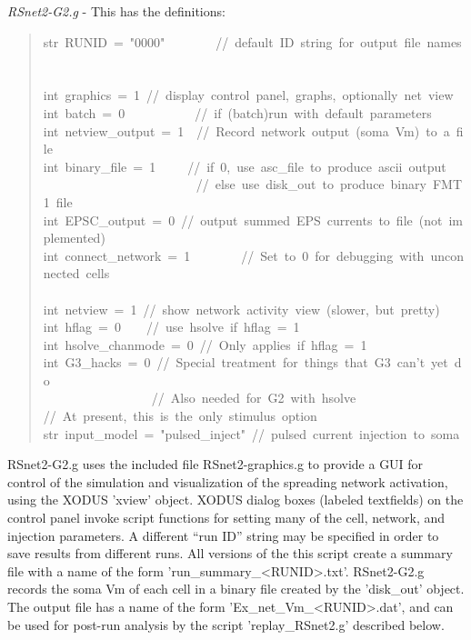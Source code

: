 \documentclass[10pt,a4paper,english]{article}
\begin{document}
\emph{RSnet2-G2.g} - This has the definitions:
\begin{quote}{\ttfamily \raggedright \noindent
str~RUNID~=~"0000"~~~~~~~~//~default~ID~string~for~output~file~names~\\
~\\
int~graphics~=~1~//~display~control~panel,~graphs,~optionally~net~view~\\
int~batch~=~0~~~~~~~~~~~//~if~(batch)run~with~default~parameters~\\
int~netview{\_}output~=~1~~//~Record~network~output~(soma~Vm)~to~a~file~\\
int~binary{\_}file~=~1~~~~~//~if~0,~use~asc{\_}file~to~produce~ascii~output~\\
~~~~~~~~~~~~~~~~~~~~~~~~//~else~use~disk{\_}out~to~produce~binary~FMT1~file~\\
int~EPSC{\_}output~=~0~//~output~summed~EPS~currents~to~file~(not~implemented)~\\
int~connect{\_}network~=~1~~~~~~~~//~Set~to~0~for~debugging~with~unconnected~cells~\\
~\\
int~netview~=~1~//~show~network~activity~view~(slower,~but~pretty)~\\
int~hflag~=~0~~~~//~use~hsolve~if~hflag~=~1~\\
int~hsolve{\_}chanmode~=~0~//~Only~applies~if~hflag~=~1~\\
int~G3{\_}hacks~=~0~//~Special~treatment~for~things~that~G3~can't~yet~do~\\
~~~~~~~~~~~~~~~~~//~Also~needed~for~G2~with~hsolve~\\
//~At~present,~this~is~the~only~stimulus~option~\\
str~input{\_}model~=~"pulsed{\_}inject"~//~pulsed~current~injection~to~soma
}\end{quote}

RSnet2-G2.g uses the included file RSnet2-graphics.g to provide a GUI for
control of the simulation and visualization of the spreading network
activation, using the XODUS 'xview' object.  XODUS dialog boxes (labeled
textfields) on the control panel invoke script functions for setting many
of the cell, network, and injection parameters.  A different ``run ID''
string may be specified in order to save results from different runs.  All
versions of the this script create a summary file with a name of the form
'run{\_}summary{\_}{\textless}RUNID{\textgreater}.txt'.  RSnet2-G2.g records the soma Vm of each cell in
a binary file created by the 'disk{\_}out' object. The output file has a name
of the form 'Ex{\_}net{\_}Vm{\_}{\textless}RUNID{\textgreater}.dat', and can be used for post-run analysis
by the script 'replay{\_}RSnet2.g' described below.
\end{document}
